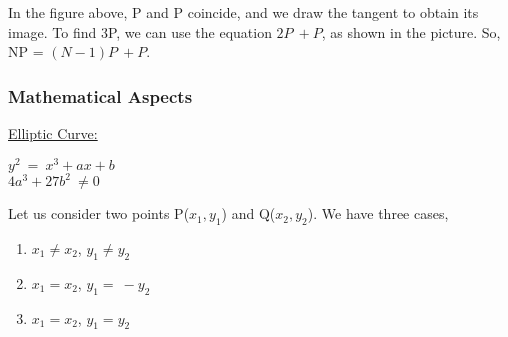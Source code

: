 \documentclass[11pt]{article}
\begin{document}
In the figure above, P and P coincide, and we draw the tangent to obtain its image. To find 3P, we can use the equation $2P \ \boxed{+} P$, as shown in the picture. So, NP = $(N-1)P \ \boxed{+} P$. \\
\subsubsection{Mathematical Aspects}
\underline{Elliptic Curve:}\\
\begin{center}
    $y^2\ =\ x^3+ax+b$\\
    \vspace{1mm}
    $4a^3+27b^2\ \neq 0$
\end{center}
Let us consider two points P($x_1, y_1$) and Q($x_2, y_2$). We have three cases,
\begin{enumerate}
    \item $x_1\neq x_2$, $y_1\neq y_2$
    \item $x_1= x_2$, $y_1=\  -y_2$
    \item $x_1= x_2$, $y_1= y_2$
    
\end{enumerate}
\end{document}
